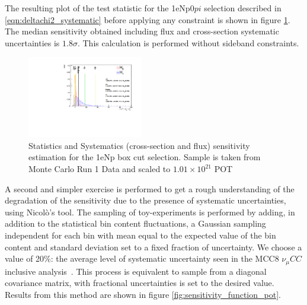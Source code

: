 \documentclass[a4paper]{article}
\newcommand{\numucc}{$\nu_{\mu} CC$ }
\begin{document}
The resulting plot of the test statistic for the 1eNp0$pi$ selection described in \ref{eqn:deltachi2_systematic} before applying any constraint is shown in figure \ref{fig:1eNp:box:statsystsensitivity}. The median sensitivity obtained including flux and cross-section systematic uncertainties is $1.8\sigma$. This calculation is performed without sideband constraints.

\begin{figure}[H]
\begin{center}
\includegraphics[width=0.45\textwidth]{Sensitivity/SBNfit_Cls_nue_reco_e_genietune_run1_LEE_syst.pdf}
\caption{\label{fig:1eNp:box:statsystsensitivity} Statistics and Systematics (cross-section and flux) sensitivity estimation for the 1eNp box cut selection. Sample is taken from Monte Carlo Run 1 Data and scaled to $1.01\times10^21$ POT}
\end{center}
\end{figure}

A second and simpler exercise is performed to get a rough understanding of the degradation of the sensitivity due to the presence of systematic uncertainties, using Nicol\`o's tool.
The sampling of toy-experiments is performed by adding, in addition to the statistical bin content fluctuations, a Gaussian sampling independent for each bin with mean equal to the expected value of the bin content and standard deviation set to a fixed fraction of uncertainty. We choose a value of 20\%: the average level of systematic uncertainty seen in the MCC8 \numucc inclusive analysis~\cite{bib:numuCCincl}.
This process is equivalent to sample from a diagonal covariance matrix, with fractional uncertainties is set to the desired value.
Results from this method are shown in figure \ref{fig:sensitivity_function_pot}.
\end{document}
